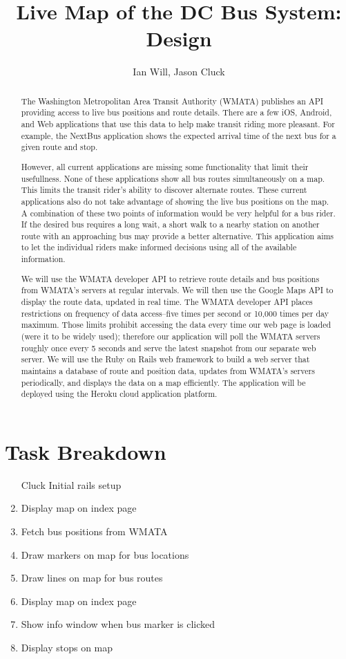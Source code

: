 \documentclass[12pt]{article}
\title{Live Map of the DC Bus System: Design}
\author{Ian Will, Jason Cluck}
\date{}
\begin{document}
\maketitle

\begin{abstract}
The Washington Metropolitan Area Transit Authority (WMATA) publishes an API providing access to live bus positions and route details.  There are a few iOS, Android, and Web applications that use this data to help make transit riding more pleasant.  For example, the NextBus application shows the expected arrival time of the next bus for a given route and stop.

However, all current applications are missing some functionality that limit their usefullness.  None of these applications show all bus routes simultaneously on a map.  This limits the transit rider's ability to discover alternate routes.  These current applications also do not take advantage of showing the live bus positions on the map.  A combination of these two points of information would be very helpful for a bus rider.  If the desired bus requires a long wait, a short walk to a nearby station on another route with an approaching bus may provide a better alternative.  This application aims to let the individual riders make informed decisions using all of the available information.

We will use the WMATA developer API to retrieve route details and bus positions from WMATA's servers at regular intervals.  We will then use the Google Maps API to display the route data, updated in real time.  The WMATA developer API places restrictions on frequency of data access--five times per second or 10,000 times per day maximum.  Those limits prohibit accessing the data every time our web page is loaded (were it to be widely used); therefore our application will poll the WMATA servers roughly once every 5 seconds and serve the latest snapshot from our separate web server.  We will use the Ruby on Rails web framework to build a web server that maintains a database of route and position data, updates from WMATA's servers periodically, and displays the data on a map efficiently.  The application will be deployed using the Heroku cloud application platform.
\end{abstract}

\section*{Task Breakdown}
\begin{enumerate}
\item [Cluck] Initial rails setup 
\item Display map on index page
\item Fetch bus positions from WMATA
\item Draw markers on map for bus locations
\item Draw lines on map for bus routes
\item Display map on index page
\item Show info window when bus marker is clicked
\item Display stops on map

\end{enumerate}
\end{document}
